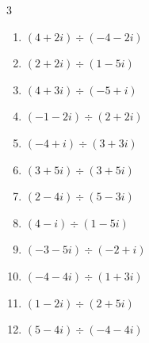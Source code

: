 \begin{multicols}{3}
\begin{enumerate}

  \item $\displaystyle (4+2i)\div(-4-2i)$

        \phantom{$\displaystyle =-1$}

  \item $\displaystyle (2+2i)\div(1-5i)$


  \item $\displaystyle (4+3i)\div(-5+i)$


  \item $\displaystyle (-1-2i)\div(2+2i)$


  \item $\displaystyle (-4+i)\div(3+3i)$


  \item $\displaystyle (3+5i)\div(3+5i)$

        \phantom{$\displaystyle =1$}

  \item $\displaystyle (2-4i)\div(5-3i)$


\columnbreak %

  \item $\displaystyle (4-i)\div(1-5i)$


  \item $\displaystyle (-3-5i)\div(-2+i)$


  \item $\displaystyle (-4-4i)\div(1+3i)$


  \item $\displaystyle (1-2i)\div(2+5i)$


  \item $\displaystyle (5-4i)\div(-4-4i)$


\end{enumerate}
\end{multicols}
